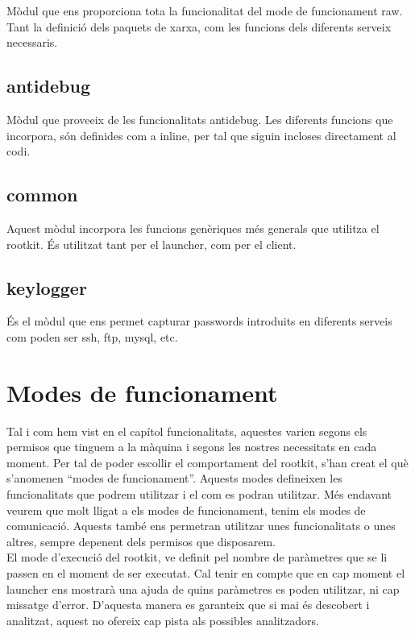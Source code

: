 Mòdul que ens proporciona tota la funcionalitat del mode de funcionament raw. Tant la definició dels
paquets de xarxa, com les funcions dels diferents serveix necessaris.

\subsection{antidebug}

Mòdul que proveeix de les funcionalitats antidebug. Les diferents funcions que incorpora, són definides
com a inline, per tal que siguin incloses directament al codi.

\subsection{common}

Aquest mòdul incorpora les funcions genèriques més generals que utilitza el rootkit. És utilitzat tant per
el launcher, com per el client.

\subsection{keylogger}

És el mòdul que ens permet capturar passwords introduits en diferents serveis com poden ser ssh, ftp, mysql, etc.
\section{Modes de funcionament}

Tal i com hem vist en el capítol funcionalitats, aquestes varien segons els permisos que tinguem a la màquina 
i segons les nostres necessitats en cada moment. Per tal de poder escollir el comportament del rootkit,
s'han creat el què s'anomenen ``modes de funcionament''. 
Aquests modes defineixen les funcionalitats que podrem utilitzar i el com es podran utilitzar. Més endavant 
veurem que molt lligat a els modes de funcionament, tenim els modes de comunicació. Aquests també ens
permetran utilitzar unes funcionalitats o unes altres, sempre depenent dels permisos que disposarem. \\

El mode d'execució del rootkit, ve definit pel nombre de paràmetres que se li passen en el moment de ser
executat. Cal tenir en compte que en cap moment el launcher ens mostrarà una ajuda de quins paràmetres 
es poden utilitzar, ni cap missatge d'error. D'aquesta manera es garanteix que si mai és descobert i analitzat, 
aquest no ofereix cap pista als possibles analitzadors. \\

